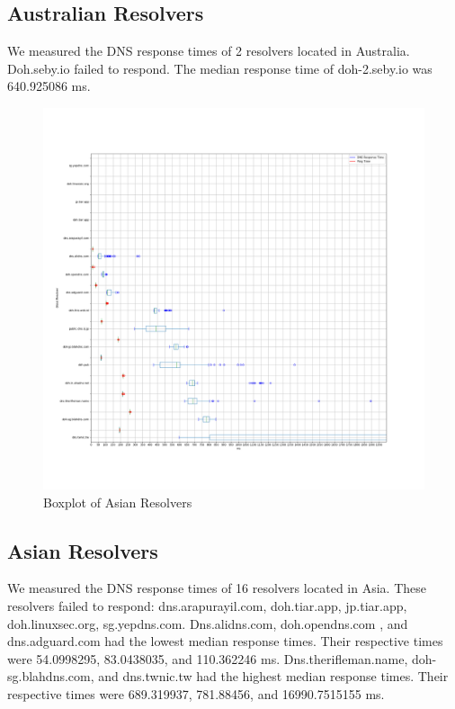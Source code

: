\subsection{Australian Resolvers}
We measured the DNS response times of 2 resolvers located in Australia. 
Doh.seby.io failed to respond. 
The median response time of doh-2.seby.io was 640.925086 ms. 

\begin{figure}[!t]
  \includegraphics[width=\linewidth]{figures/100_Asia.png}
  \caption{Boxplot of Asian Resolvers}
  \label{fig:AsiaPlots}
\end{figure}

\subsection{Asian Resolvers}
We measured the DNS response times of 16 resolvers located in Asia. 
These resolvers failed to respond: dns.arapurayil.com, doh.tiar.app, jp.tiar.app, doh.linuxsec.org, sg.yepdns.com.
Dns.alidns.com, doh.opendns.com , and dns.adguard.com had the lowest median response times. 
Their respective times were 54.0998295, 83.0438035, and  110.362246 ms. 
Dns.therifleman.name, doh-sg.blahdns.com, and dns.twnic.tw had the highest median response times. 
Their respective times were 689.319937, 781.88456, and 16990.7515155 ms. 

